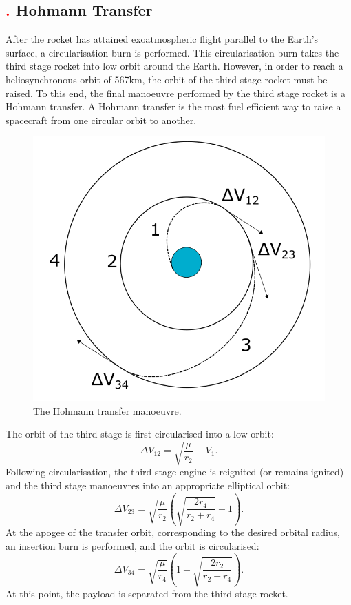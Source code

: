 \subsection{\textcolor{red}{.} Hohmann Transfer}
After the rocket has attained exoatmospheric flight parallel to the Earth's surface, a circularisation burn is performed. This circularisation burn takes the third stage rocket into low orbit around the Earth. 
However, in order to reach a heliosynchronous orbit of 567km, the orbit of the third stage rocket must be raised. 
To this end, the final manoeuvre performed by the third stage rocket is a Hohmann transfer. A Hohmann transfer is the most fuel efficient way to raise a spacecraft from one circular orbit to another\cite{hohmann}. 
\begin{figure}
\centering
\includegraphics[width=0.7\linewidth]{figures/4_LODESTAR/Hohmann}
\caption{The Hohmann transfer manoeuvre.}
\label{fig:Hohmann}
\end{figure}
The orbit of the third stage is first circularised into a low orbit:
\begin{equation}
\Delta V_{12} = \sqrt{\dfrac{\mu}{r_2}} - V_1.
\end{equation}
Following circularisation, the third stage engine is reignited (or remains ignited) and the third stage manoeuvres into an appropriate elliptical orbit: 
\begin{equation}
\Delta V_{23} = \sqrt{\dfrac{\mu}{r_2}} \left( \sqrt{\dfrac{2r_4}{r_2 + r_4}} -1 \right).
\end{equation}
At the apogee of the transfer orbit, corresponding to the desired orbital radius, an insertion burn is performed, and the orbit is circularised:
\begin{equation}
\Delta V_{34} = \sqrt{\dfrac{\mu}{r_4}} \left(1- \sqrt{\dfrac{2r_2}{r_2 + r_4}}  \right).
\end{equation}
At this point, the payload is separated from the third stage rocket. 

